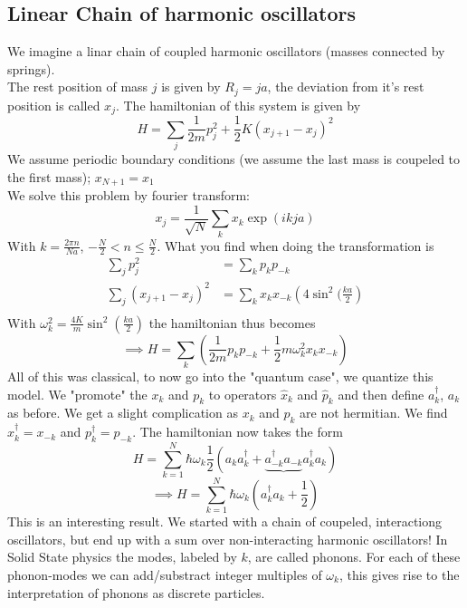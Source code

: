 \documentclass{report}
\begin{document}
\subsection{Linear Chain of harmonic oscillators}
We imagine a linar chain of coupled harmonic oscillators (masses connected by springs).\\
The rest position of mass $j$ is given by $R_j = ja$, the deviation from it's rest position is called $x_j$. The hamiltonian of this system is given by \[
	H = \sum_{j} \frac{1}{2m} p_j^2 + \frac{1}{2}K \left( x_{j+1} - x_j \right)^2
\] We assume periodic boundary conditions (we assume the last mass is coupeled to the first mass); $x_{N+1} = x_1$\\
We solve this problem by fourier transform: \[
	x_j = \frac{1}{\sqrt{N} } \sum_{k} x_k \exp(ikja)
\] With $k = \frac{2 \pi n}{Na}$, $-\frac{N}{2} < n \le  \frac{N}{2}$. What you find when doing the transformation is
\begin{align*}
	\sum_{j} p_j^2 &= \sum_{k} p_k p_{-k} \\
	\sum_{j} \left( x_{j+1} - x_j \right)^2 &= \sum_{k} x_k x_{-k} \left( 4 \sin^2( \frac{ka}{2} \right) \\
\end{align*}
With $\omega_k^2 = \frac{4K}{m} \sin^2\left( \frac{ka}{2} \right) $ the hamiltonian thus becomes \[
	\implies H = \sum_{k} \left( \frac{1}{2m}  p_k p_{-k} + \frac{1}{2} m  \omega_k^2  x_k x_{-k} \right) 
\] All of this was classical, to now go into the "quantum case", we quantize this model. We "promote" the $x_k$ and $p_k$ to operators $\hat{x}_k$ and $\hat{p}_k$ and then define $a_k^\dagger$, $a_k$ as before.
We get a slight complication as $x_k$ and $p_k$ are not hermitian. We find $x_k^\dagger = x_{-k}$ and $p_k^\dagger = p_{-k}$. The hamiltonian now takes the form  \[
	H = \sum_{k=1}^{N} \hbar \omega_k \frac{1}{2} \left( a_k a_k^\dagger + \underbrace{a_{-k}^\dagger a_{-k}}{a_k^\dagger a_k} \right) 
\]\[
\implies H = \sum_{k=1}^{N} \hbar \omega_k \left( a_k^\dagger a_k + \frac{1}{2} \right) 
\] This is an interesting result. We started with a chain of coupeled, interactiong oscillators, but end up with a sum over non-interacting harmonic oscillators! In Solid State physics the modes, labeled by $k$, are called phonons. For each of these phonon-modes we can add/substract integer multiples of $\omega_k$, this gives rise to the interpretation of phonons as discrete particles.
\end{document}
